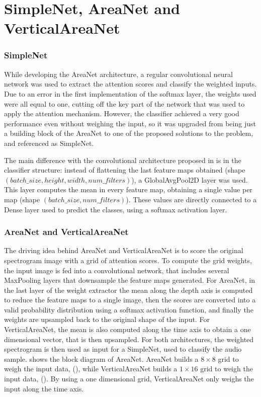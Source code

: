 
\section{SimpleNet, AreaNet and VerticalAreaNet}
\label{sec:area_net}

\subsubsection{SimpleNet}

While developing the AreaNet architecture, a regular convolutional neural
network was used to extract the attention scores and classify the weighted
inputs.
Due to an error in the first implementation of the softmax layer, the weights
used were all equal to one, cutting off the key part of the network that was
used to apply the attention mechanism.
However, the classifier achieved a very good performance even without weighing
the input, so it was upgraded from being just a building block of the AreaNet
to one of the proposed solutions to the problem, and referenced as SimpleNet.

The main difference with the convolutional architecture proposed in
 is in the classifier structure:
instead of flattening the last feature maps obtained
(shape $(batch\_size, height, width, num\_filters)$),
a GlobalAvgPool2D layer was used.
This layer computes the mean in every feature map, obtaining a single value per
map (shape $(batch\_size, num\_filters)$).
These values are directly connected to a Dense layer used to predict the classes,
using a softmax activation layer.

\subsubsection{AreaNet and VerticalAreaNet}

The driving idea behind AreaNet and VerticalAreaNet is to score the original
spectrogram image with a grid of attention scores.
%
To compute the grid weights, the input image is fed into a convolutional
network, that includes several MaxPooling layers that downsample the feature
maps generated.
%
For AreaNet, in the last layer of the weight extractor the mean along the depth
axis is computed to reduce the feature maps to a single image,
then the scores are converted into a valid probability distribution using a
softmax activation function, and finally the weights are upsampled back to the
original shape of the input.
%
For VerticalAreaNet, the mean is also computed along the time axis to obtain a
one dimensional vector, that is then upsampled.
%
For both architectures, the weighted spectrogram is then used as input for a
SimpleNet, used to classify the audio sample.
%
 shows the block diagram of AreaNet.
%
AreaNet builds a $8 \times 8$ grid to weigh the input data,
(),
while
VerticalAreaNet builds a $1 \times 16$ grid to weigh the input data,
().
By using a one dimensional grid, VerticalAreaNet only weighs the input along
the time axis.

